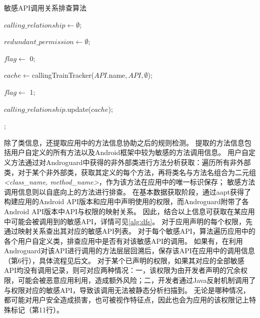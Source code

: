 \begin{algorithm}[!ht]
    \tablewuhao
    \caption{敏感API调用关系排查算法}
    \label{alg:dfs}

     {

        $calling\_relationship \gets \emptyset$;

        $redundant\_permission \gets \emptyset$;

         {
            $flag \gets$ 0;
             {

                $cache \gets $callingTrainTracker($API$.name$, API, \emptyset$);

                 {
                    $flag \gets$ 1;
                }

                $calling\_relationship$.update($cache$);
            }


        }
        ;

    }
\end{algorithm}

除了类信息，\componentB 还提取应用中的方法信息协助之后的规则检测。
提取的方法信息包括用户自定义的所有方法以及Android框架中较为敏感的方法调用信息。
用户自定义方法通过对Androguard中获得的非外部类进行方法分析获取：\componentB 遍历所有非外部类，对于某个非外部类，获取其定义的每个方法，再将类名与方法名组合为二元组\textit{<class\_name, method\_name>}，作为该方法在应用中的唯一标识保存；
敏感方法调用信息则以自底向上的方法进行排查。
在基本数据获取阶段，\componentB 通过aapt获得了构建应用的Android API版本和应用中声明使用的权限，而Androguard附带了各Android API版本中API与权限的映射关系。
因此，结合以上信息可获取在某应用中可能会被调用到的敏感API，详情可见\autoref{alg:dfs}。
对于应用声明的每个权限，先通过映射关系查出其对应的敏感API列表。
对于每个敏感API，算法遍历应用中的各个用户自定义类，排查应用中是否有对该敏感API的调用。
如果有，在利用Androguard对该API进行调用的方法层层回溯后，保存该API在应用中的调用信息（第6行），具体流程见后文。
对于某个已声明的权限，如果其对应的全部敏感API均没有调用记录，则可对应两种情况：一，该权限为由开发者声明的冗余权限，可能会被恶意应用利用，造成额外风险；二，开发者通过Java反射机制调用了与权限对应的敏感API，导致该调用无法被静态分析扫描到。
无论是哪种情况，都可能对用户安全造成损害，也可被视作特征点，因此\componentB 也会为应用的该权限记上特殊标记（第11行）。

